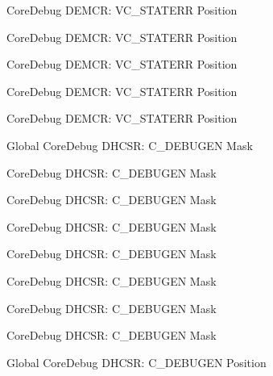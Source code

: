 \begin{DoxyRefList}
\label{deprecated__deprecated000061}%
%
Core\+Debug DEMCR\+: VC\+\_\+\+STATERR Position 

\label{deprecated__deprecated000423}%
%
Core\+Debug DEMCR\+: VC\+\_\+\+STATERR Position 

\label{deprecated__deprecated000347}%
%
Core\+Debug DEMCR\+: VC\+\_\+\+STATERR Position 

\label{deprecated__deprecated000614}%
%
Core\+Debug DEMCR\+: VC\+\_\+\+STATERR Position 

\label{deprecated__deprecated000512}%
%
Core\+Debug DEMCR\+: VC\+\_\+\+STATERR Position  
\item[Global \doxylink{group___c_m_s_i_s___core_debug_gab815c741a4fc2a61988cd2fb7594210b}{Core\+Debug\+\_\+\+DHCSR\+\_\+\+C\+\_\+\+DEBUGEN\+\_\+\+Msk} ]\label{deprecated__deprecated000128}%
%
Core\+Debug DHCSR\+: C\+\_\+\+DEBUGEN Mask 

\label{deprecated__deprecated000491}%
%
Core\+Debug DHCSR\+: C\+\_\+\+DEBUGEN Mask 

\label{deprecated__deprecated000040}%
%
Core\+Debug DHCSR\+: C\+\_\+\+DEBUGEN Mask 

\label{deprecated__deprecated000593}%
%
Core\+Debug DHCSR\+: C\+\_\+\+DEBUGEN Mask 

\label{deprecated__deprecated000184}%
%
Core\+Debug DHCSR\+: C\+\_\+\+DEBUGEN Mask 

\label{deprecated__deprecated000402}%
%
Core\+Debug DHCSR\+: C\+\_\+\+DEBUGEN Mask 

\label{deprecated__deprecated000267}%
%
Core\+Debug DHCSR\+: C\+\_\+\+DEBUGEN Mask 

\label{deprecated__deprecated000326}%
%
Core\+Debug DHCSR\+: C\+\_\+\+DEBUGEN Mask  
\item[Global \doxylink{group___c_m_s_i_s___core_debug_gab557abb5b172b74d2cf44efb9d824e4e}{Core\+Debug\+\_\+\+DHCSR\+\_\+\+C\+\_\+\+DEBUGEN\+\_\+\+Pos} ]\label{deprecated__deprecated000183}%
%
Core\+Debug DHCSR\+: C\+\_\+\+DEBUGEN Position 


\end{DoxyRefList}
